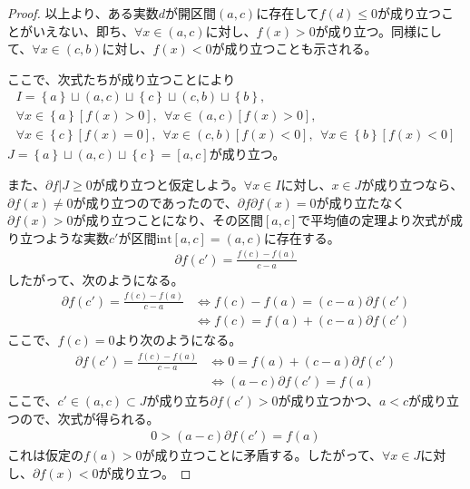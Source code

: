 \documentclass[dvipdfmx]{jsarticle}
\begin{document}
\begin{proof}
以上より、ある実数$d$が開区間$(a,c)$に存在して$f(d) \leq 0$が成り立つことがいえない、即ち、$\forall x \in (a,c)$に対し、$f(x) > 0$が成り立つ。同様にして、$\forall x \in (c,b)$に対し、$f(x) < 0$が成り立つことも示される。\par
ここで、次式たちが成り立つことにより
\begin{align*}
I = \left\{ a \right\} \sqcup (a,c) \sqcup \left\{ c \right\} \sqcup (c,b) \sqcup \left\{ b \right\},\\
\forall x \in \left\{ a \right\}\left[ f(x) > 0 \right],\ \ 
\forall x \in (a,c)\left[ f(x) > 0 \right],\\
\forall x \in \left\{ c \right\}\left[ f(x) = 0 \right],\ \ 
\forall x \in (c,b)\left[ f(x) < 0 \right],\ \ 
\forall x \in \left\{ b \right\}\left[ f(x) < 0 \right]
\end{align*}
$J = \left\{ a \right\} \sqcup (a,c) \sqcup \left\{ c \right\} = [ a,c]$が成り立つ。\par
また、$\partial f|J \geq 0$が成り立つと仮定しよう。$\forall x \in I$に対し、$x \in J$が成り立つなら、$\partial f(x) \neq 0$が成り立つのであったので、$\partial f\partial f(x) = 0$が成り立たなく$\partial f(x) > 0$が成り立つことになり、その区間$[ a,c]$で平均値の定理より次式が成り立つような実数$c'$が区間$\mathrm{int}[ a,c] = (a,c)$に存在する。
\begin{align*}
\partial f\left( c' \right) = \frac{f(c) - f(a)}{c - a}
\end{align*}
したがって、次のようになる。
\begin{align*}
\partial f\left( c' \right) = \frac{f(c) - f(a)}{c - a} &\Leftrightarrow f(c) - f(a) = (c - a)\partial f\left( c' \right)\\
&\Leftrightarrow f(c) = f(a) + (c - a)\partial f\left( c' \right)
\end{align*}
ここで、$f(c) = 0$より次のようになる。
\begin{align*}
\partial f\left( c' \right) = \frac{f(c) - f(a)}{c - a} &\Leftrightarrow 0 = f(a) + (c - a)\partial f\left( c' \right)\\
&\Leftrightarrow (a - c)\partial f\left( c' \right) = f(a)
\end{align*}
ここで、$c' \in (a,c) \subset J$が成り立ち$\partial f\left( c' \right) > 0$が成り立つかつ、$a < c$が成り立つので、次式が得られる。
\begin{align*}
0 > (a - c)\partial f\left( c' \right) = f(a)
\end{align*}
これは仮定の$f(a) > 0$が成り立つことに矛盾する。したがって、$\forall x \in J$に対し、$\partial f(x) < 0$が成り立つ。\par

\end{proof}
\end{document}
